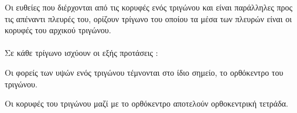 \documentclass[twoside,nofonts,internet,shmeiwseis]{thewria}
\begin{document}
Οι ευθείες που διέρχονται από τις κορυφές ενός τριγώνου και είναι παράλληλες προς τις απέναντι πλευρές του, ορίζουν τρίγωνο του οποίου τα μέσα των πλευρών είναι οι κορυφές του αρχικού τριγώνου.\\\\
Σε κάθε τρίγωνο ισχύουν οι εξής προτάσεις :
\begin{rlist}
\item Οι φορείς των υψών ενός τριγώνου τέμνονται στο ίδιο σημείο, το ορθόκεντρο του τριγώνου.
\item Οι κορυφές του τριγώνου μαζί με το ορθόκεντρο αποτελούν ορθοκεντρική τετράδα.
\end{rlist}
\end{document}
